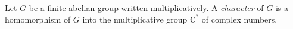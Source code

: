 Let $G$ be a finite abelian group written multiplicatively. A \emph{character} of $G$ is a homomorphism of $G$ into the multiplicative group $\mathbb{C}^*$ of complex numbers.
